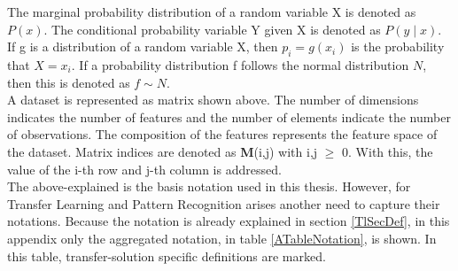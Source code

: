 The marginal probability distribution of a random variable X is denoted as $P(x)$.
The conditional probability variable Y given X is denoted as $P(y \mid x)$.
If g is a distribution of a random variable X, then $p_i=g(x_i)$ is the probability that $X=x_i$.
If a probability distribution f follows the normal distribution $N$, then this is denoted as $f\sim N$.\\
A dataset is represented as matrix shown above.
The number of dimensions indicates the number of features and the number of elements indicate the number of observations.
The composition of the features represents the feature space of the dataset.
Matrix indices are denoted as \textbf{M}(i,j) with i,j $\ge$ 0.
With this, the value of the i-th row and j-th column is addressed.\\
The above-explained is the basis notation used in this thesis. 
However, for Transfer Learning and Pattern Recognition arises another need to capture their notations.
Because the notation is already explained in section \ref{TlSecDef}, in this appendix only the aggregated notation, in table \ref{ATableNotation}, is shown.
In this table, transfer-solution specific definitions are marked.
